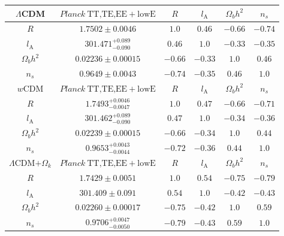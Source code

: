 \documentclass[floatfix,aps,amsmath,nofootinbib,onecolumn,10pt]{revtex4}
\begin{document}
\begin{table}[!htp]
\centering
\renewcommand{\arraystretch}{1.5}
\begin{tabular}{cccccc}
\hline\hline
  $\Lambda$CDM & $Planck~ \textrm{TT,TE,EE}+\textrm{lowE} $ & $R$ & $l_\textrm{A}$ & $\Omega_b h^2$ &$n_s$ \\
\hline 
$R$                                           & $1.7502\pm0.0046$       & $1.0$&    $0.46$&   $-0.66$&   $-0.74$ \\
$l_\textrm{A}$                                & $301.471^{+0.089}_{-0.090}$        & $0.46$&    $1.0$&   $-0.33$&   $-0.35$ \\
$\Omega_b h^2$                              & $0.02236\pm0.00015$      & $-0.66$&   $-0.33$&  $1.0$&    $0.46$\\
$n_s$                                        & $0.9649\pm0.0043$       & $-0.74$&   $-0.35$&  $0.46$&    $1.0$\\
\hline\hline
  $w$CDM & $Planck~ \textrm{TT,TE,EE}+\textrm{lowE} $ & $R$ & $l_\textrm{A}$ & $\Omega_b h^2$ &$n_s$ \\
\hline 
$R$                                           & $1.7493^{+0.0046}_{-0.0047}$       & $1.0$&    $0.47$&   $-0.66$&   $-0.71$ \\
$l_\textrm{A}$                                & $301.462^{+0.089}_{-0.090}$         & $0.47$&    $1.0$&   $-0.34$&   $-0.36$ \\
$\Omega_b h^2$                               & $0.02239\pm0.00015$      & $-0.66$&   $-0.34$&  $1.0$&    $0.44$ \\
$n_s$                                        & $0.9653^{+0.0043}_{-0.0044}$       & $-0.72$&   $-0.36$&  $0.44$&    $1.0$\\
\hline\hline
   $\Lambda$CDM$+\Omega_k$ & $Planck~ \textrm{TT,TE,EE}+\textrm{lowE} $ & $R$ & $l_\textrm{A}$ & $\Omega_b h^2$ &$n_s$\\
\hline 
$R$                                           & $1.7429\pm0.0051$       & $1.0$&    $0.54$&   $-0.75$&   $-0.79$ \\
$l_\textrm{A}$                                & $301.409\pm0.091$        & $0.54$&    $1.0$&   $-0.42$&   $-0.43$\\
$\Omega_b h^2$                              & $0.02260\pm0.00017$      & $-0.75$&   $-0.42$&  $1.0$&    $0.59$ \\
$n_s$                                        & $0.9706^{+0.0047}_{-0.0050}$       & $-0.79$&   $-0.43$&  $0.59$&    $1.0$\\

\end{tabular}
\end{table}
\end{document}
